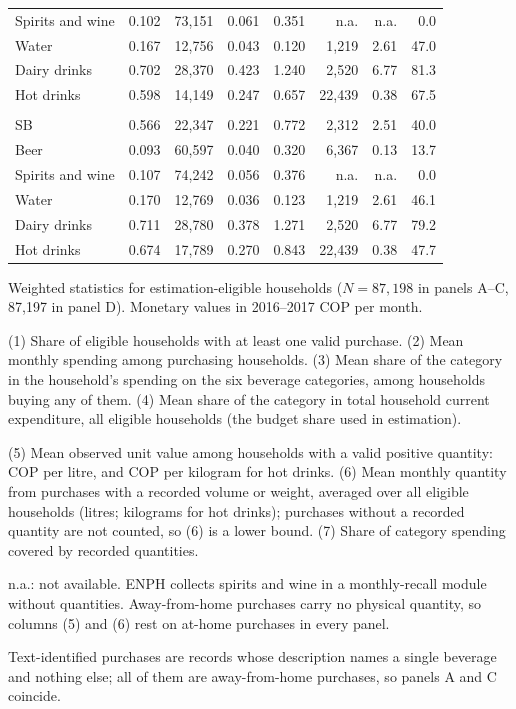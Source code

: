 \begin{table}[!htbp]
\begin{threeparttable}
\begin{tabular}{lrrrrrrr}
Spirits and wine & 0.102 & 73,151 & 0.061 & 0.351 & n.a. & n.a. & 0.0 \\
Water & 0.167 & 12,756 & 0.043 & 0.120 & 1,219 & 2.61 & 47.0 \\
Dairy drinks & 0.702 & 28,370 & 0.423 & 1.240 & 2,520 & 6.77 & 81.3 \\
Hot drinks & 0.598 & 14,149 & 0.247 & 0.657 & 22,439 & 0.38 & 67.5 \\
\addlinespace\multicolumn{8}{l}{\textit{D. Coded and text-identified purchases --- combined market}} \\
SB & 0.566 & 22,347 & 0.221 & 0.772 & 2,312 & 2.51 & 40.0 \\
Beer & 0.093 & 60,597 & 0.040 & 0.320 & 6,367 & 0.13 & 13.7 \\
Spirits and wine & 0.107 & 74,242 & 0.056 & 0.376 & n.a. & n.a. & 0.0 \\
Water & 0.170 & 12,769 & 0.036 & 0.123 & 1,219 & 2.61 & 46.1 \\
Dairy drinks & 0.711 & 28,780 & 0.378 & 1.271 & 2,520 & 6.77 & 79.2 \\
Hot drinks & 0.674 & 17,789 & 0.270 & 0.843 & 22,439 & 0.38 & 47.7 \\
\bottomrule
\end{tabular}
\begin{tablenotes}[flushleft]
\footnotesize
\item Weighted statistics for estimation-eligible households ($N = 87,198$ in panels A--C, 87,197 in panel D). Monetary values in 2016--2017 COP per month.
\item (1) Share of eligible households with at least one valid purchase. (2) Mean monthly spending among purchasing households. (3) Mean share of the category in the household's spending on the six beverage categories, among households buying any of them. (4) Mean share of the category in total household current expenditure, all eligible households (the budget share used in estimation).
\item (5) Mean observed unit value among households with a valid positive quantity: COP per litre, and COP per kilogram for hot drinks. (6) Mean monthly quantity from purchases with a recorded volume or weight, averaged over all eligible households (litres; kilograms for hot drinks); purchases without a recorded quantity are not counted, so (6) is a lower bound. (7) Share of category spending covered by recorded quantities.
\item n.a.: not available. ENPH collects spirits and wine in a monthly-recall module without quantities. Away-from-home purchases carry no physical quantity, so columns (5) and (6) rest on at-home purchases in every panel.
\item Text-identified purchases are records whose description names a single beverage and nothing else; all of them are away-from-home purchases, so panels A and C coincide.
\end{tablenotes}
\end{threeparttable}
\end{table}

